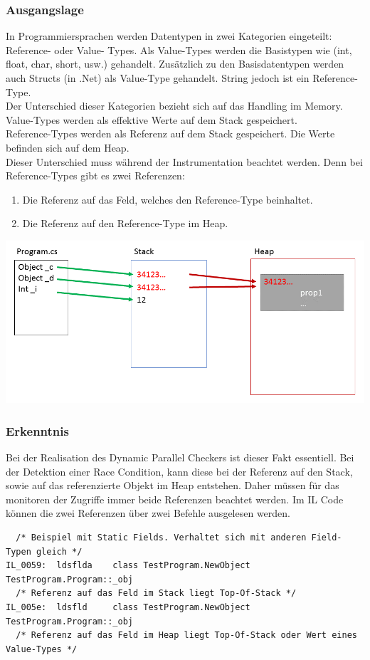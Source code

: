 \documentclass[10pt,a4paper]{article}
\begin{document}
\subsubsection{Ausgangslage}
\begin{flushleft}
In Programmiersprachen werden Datentypen in zwei Kategorien eingeteilt: Reference- oder Value- Types. Als Value-Types werden die Basistypen wie (int, float, char, short, usw.) gehandelt. Zusätzlich zu den Basisdatentypen werden auch Structs (in .Net) als Value-Type gehandelt. String jedoch ist ein Reference-Type.\\
Der Unterschied dieser Kategorien bezieht sich auf das Handling im Memory. Value-Types werden als effektive Werte auf dem Stack gespeichert.\\
Reference-Types werden als Referenz auf dem Stack gespeichert. Die Werte befinden sich auf dem Heap.\\
Dieser Unterschied muss während der Instrumentation beachtet werden. Denn bei Reference-Types gibt es zwei Referenzen: 
\begin{enumerate}
\item Die {\color{stackreferencegreen} Referenz} auf das Feld, welches den Reference-Type beinhaltet.
\item Die {\color{heapreferencered}Referenz} auf den Reference-Type im Heap.
\end{enumerate}
\includegraphics[width=14cm, clip]{pictures/ValueReferenceType.png}
\end{flushleft}
\subsubsection{Erkenntnis}
\begin{flushleft}
Bei der Realisation des Dynamic Parallel Checkers ist dieser Fakt essentiell. Bei der Detektion einer Race Condition, kann diese bei der Referenz auf den Stack, sowie auf das referenzierte Objekt im Heap entstehen.
Daher müssen für das monitoren der Zugriffe immer beide Referenzen beachtet werden.
Im IL Code können die zwei Referenzen über zwei Befehle ausgelesen werden.
\begin{lstlisting} 
  /* Beispiel mit Static Fields. Verhaltet sich mit anderen Field-Typen gleich */
IL_0059:  ldsflda    class TestProgram.NewObject TestProgram.Program::_obj
  /* Referenz auf das Feld im Stack liegt Top-Of-Stack */
IL_005e:  ldsfld     class TestProgram.NewObject TestProgram.Program::_obj
  /* Referenz auf das Feld im Heap liegt Top-Of-Stack oder Wert eines Value-Types */
\end{lstlisting}
\end{flushleft}
\newpage
\end{document}
